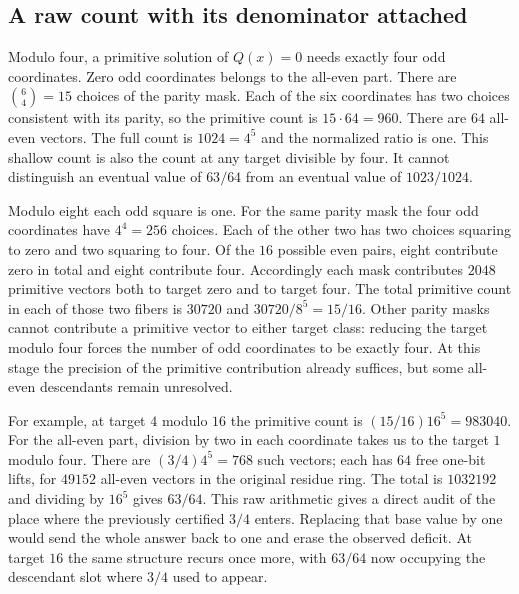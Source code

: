 \documentclass[12pt,letterpaper]{article}
\begin{document}
\subsection{A raw count with its denominator attached}
Modulo four, a primitive solution of $Q(x)=0$ needs exactly four odd coordinates. Zero odd coordinates belongs to the all-even part. There are $\binom{6}{4}=15$ choices of the parity mask. Each of the six coordinates has two choices consistent with its parity, so the primitive count is $15\cdot64=960$. There are $64$ all-even vectors. The full count is $1024=4^5$ and the normalized ratio is one. This shallow count is also the count at any target divisible by four. It cannot distinguish an eventual value of $63/64$ from an eventual value of $1023/1024$.

Modulo eight each odd square is one. For the same parity mask the four odd coordinates have $4^4=256$ choices. Each of the other two has two choices squaring to zero and two squaring to four. Of the $16$ possible even pairs, eight contribute zero in total and eight contribute four. Accordingly each mask contributes $2048$ primitive vectors both to target zero and to target four. The total primitive count in each of those two fibers is $30720$ and $30720/8^5=15/16$. Other parity masks cannot contribute a primitive vector to either target class: reducing the target modulo four forces the number of odd coordinates to be exactly four. At this stage the precision of the primitive contribution already suffices, but some all-even descendants remain unresolved.

For example, at target $4$ modulo $16$ the primitive count is $(15/16)16^5=983040$. For the all-even part, division by two in each coordinate takes us to the target $1$ modulo four. There are $(3/4)4^5=768$ such vectors; each has $64$ free one-bit lifts, for $49152$ all-even vectors in the original residue ring. The total is $1032192$ and dividing by $16^5$ gives $63/64$. This raw arithmetic gives a direct audit of the place where the previously certified $3/4$ enters. Replacing that base value by one would send the whole answer back to one and erase the observed deficit. At target $16$ the same structure recurs once more, with $63/64$ now occupying the descendant slot where $3/4$ used to appear.
\end{document}
